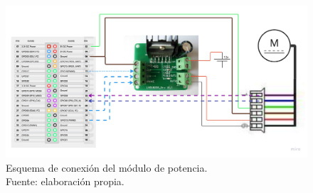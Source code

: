 \begin{figure}[H]
		\centering
		\includegraphics[scale = 0.15]{part/Proyecto_ejecutivo/memoria_constructiva/motor/img/connection diagram}
		\caption{Esquema de conexión del módulo de potencia.\\Fuente: elaboración propia.}\label{fig:conectionDiagram}
\end{figure}